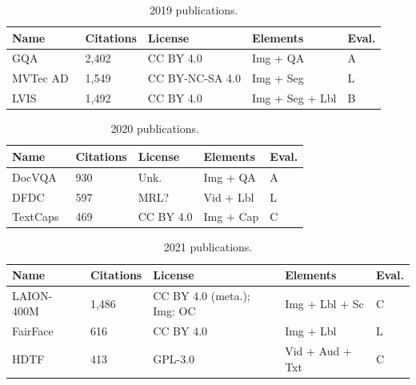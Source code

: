 ﻿\documentclass[11pt,a4paper]{article}
\begin{document}
\begin{table}[H]
\centering
\caption{2019 publications.}
\begin{tabular}{p{2.5cm}p{1.65cm}p{3.05cm}p{3.2cm}p{2.15cm}}
\hline
\textbf{Name} & \textbf{Citations} & \textbf{License} & \textbf{Elements} & \textbf{Eval.}\\
\hline
GQA~\cite{hudson2019gqa} & 2,402 & CC BY 4.0 & Img + QA & A\\
\hline
MVTec AD~\cite{bergmann2019mvtec} & 1,549 & CC BY-NC-SA 4.0 & Img + Seg & L\\
\hline
LVIS~\cite{gupta2019lvis} & 1,492 & CC BY 4.0 & Img + Seg + Lbl & B\\
\hline

\end{tabular}
\end{table}

\begin{table}[H]
\centering
\caption{2020 publications.}
\begin{tabular}{p{2.5cm}p{1.65cm}p{3.05cm}p{3.2cm}p{2.15cm}}
\hline
\textbf{Name} & \textbf{Citations} & \textbf{License} & \textbf{Elements} & \textbf{Eval.}\\
\hline
DocVQA~\cite{mathew2020docvqa} & 930 & Unk. & Img + QA & A\\
\hline
DFDC~\cite{dolhansky2020dfdc} & 597 & MRL? & Vid + Lbl & L\\
\hline
TextCaps~\cite{sidorov2020textcaps} & 469 & CC BY 4.0 & Img + Cap & C\\
\hline

\end{tabular}
\end{table}

\begin{table}[H]
\centering
\caption{2021 publications.}
\begin{tabular}{p{2.5cm}p{1.65cm}p{3.05cm}p{3.2cm}p{2.15cm}}
\hline
\textbf{Name} & \textbf{Citations} & \textbf{License} & \textbf{Elements} & \textbf{Eval.}\\
\hline
LAION-400M~\cite{schuhmann2021laion400m} & 1,486 & CC BY 4.0 (meta.); Img: OC & Img + Lbl + Sc & C\\
\hline
FairFace~\cite{karkkainen2021fairface} & 616 & CC BY 4.0 & Img + Lbl & L\\
\hline
HDTF~\cite{zhang2021hdtf} & 413 & GPL-3.0 & Vid + Aud + Txt & C\\
\hline

\end{tabular}
\end{table}
\end{document}
